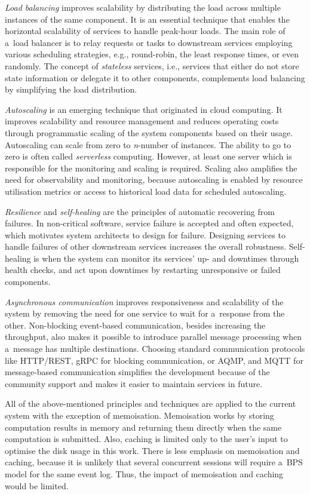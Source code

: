 \documentclass[12pt]{article}
\begin{document}
\emph{Load balancing} improves scalability by distributing the load across multiple instances of the same component. It is an essential technique that enables the horizontal scalability of services to handle peak-hour loads. The main role of a~load balancer is to relay requests or tasks to downstream services employing various scheduling strategies, e.g., round-robin, the least response times, or even randomly. The concept of \emph{stateless} services, i.e., services that either do not store state information or delegate it to other components, complements load balancing by simplifying the load distribution.

\emph{Autoscaling} is an emerging technique that originated in cloud computing. It improves scalability and resource management and reduces operating costs through programmatic scaling of the system components based on their usage. Autoscaling can scale from zero to \emph{n}-number of instances. The ability to go to zero is often called \emph{serverless} computing. However, at least one server which is responsible for the monitoring and scaling is required. Scaling also amplifies the need for observability and monitoring, because autoscaling is enabled by resource utilisation metrics or access to historical load data for scheduled autoscaling.

\emph{Resilience} and \emph{self-healing} are the principles of automatic recovering from failures. In non-critical software, service failure is accepted and often expected, which motivates system architects to design for failure. Designing services to handle failures of other downstream services increases the overall robustness. Self-healing is when the system can monitor its services' up- and downtimes through health checks, and act upon downtimes by restarting unresponsive or failed components.

\emph{Asynchronous communication} improves responsiveness and scalability of the system by removing the need for one service to wait for a~response from the other. Non-blocking event-based communication, besides increasing the throughput, also makes it possible to introduce parallel message processing when a~message has multiple destinations. Choosing standard communication protocols like HTTP/REST, gRPC for blocking communication, or AQMP, and MQTT for message-based communication simplifies the development because of the community support and makes it easier to maintain services in future.

All of the above-mentioned principles and techniques are applied to the current system with the exception of memoisation. 
Memoisation works by storing computation results in memory and returning them directly when the same computation is submitted.
Also, caching is limited only to the user's input to optimise the disk usage in this work.
There is less emphasis on memoisation and caching, because it is unlikely that several concurrent sessions will require a~BPS model for the same event log.
Thus, the impact of memoisation and caching would be limited.
\end{document}
